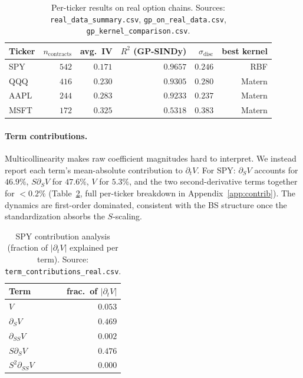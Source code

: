 \documentclass[10pt]{article}
\begin{document}
\begin{table}[h]
\centering\small
\caption{Per-ticker results on real option chains. Sources: \texttt{real\_data\_summary.csv}, \texttt{gp\_on\_real\_data.csv}, \texttt{gp\_kernel\_comparison.csv}.}
\label{tab:real}
\begin{tabular}{lrrrrr}
\toprule
Ticker & $n_{\text{contracts}}$ & avg.\ IV & $R^2$ (GP-SINDy) & $\sigma_{\text{disc}}$ & best kernel \\
\midrule
SPY  & $542$ & $0.171$ & $\mathbf{0.9657}$ & $0.246$ & RBF \\
QQQ  & $416$ & $0.230$ & $0.9305$ & $0.280$ & Matern \\
AAPL & $244$ & $0.283$ & $0.9233$ & $0.237$ & Matern \\
MSFT & $172$ & $0.325$ & $0.5318$ & $0.383$ & Matern \\
\bottomrule
\end{tabular}
\end{table}

\paragraph{Term contributions.} Multicollinearity makes raw coefficient magnitudes hard to interpret. We instead report each term's mean-absolute contribution to $\partial_t V$. For SPY: $\partial_S V$ accounts for $46.9\%$, $S\partial_S V$ for $47.6\%$, $V$ for $5.3\%$, and the two second-derivative terms together for $<0.2\%$ (Table~\ref{tab:contrib-spy}, full per-ticker breakdown in Appendix~\ref{app:contrib}). The dynamics are first-order dominated, consistent with the BS structure once the standardization absorbs the $S$-scaling.

\begin{table}[h]
\centering\small
\caption{SPY contribution analysis (fraction of $|\partial_t V|$ explained per term). Source: \texttt{term\_contributions\_real.csv}.}
\label{tab:contrib-spy}
\begin{tabular}{lr}
\toprule
Term & frac.\ of $|\partial_t V|$ \\
\midrule
$V$ & $0.053$ \\
$\partial_S V$ & $0.469$ \\
$\partial_{SS}V$ & $0.002$ \\
$S\partial_S V$ & $0.476$ \\
$S^2\partial_{SS}V$ & $0.000$ \\
\bottomrule
\end{tabular}
\end{table}
\end{document}
